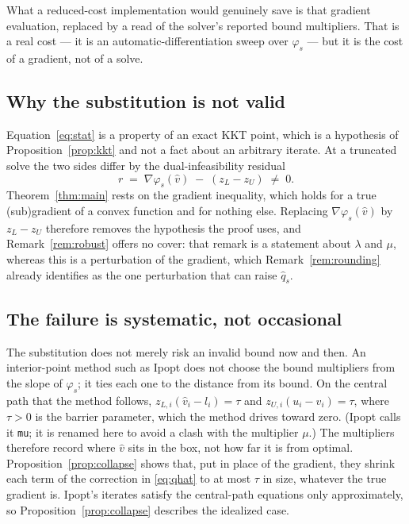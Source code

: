 \documentclass[11pt]{article}
\theoremstyle{plain}
\theoremstyle{remark}
\newcommand{\vhat}{\hat{v}}
\newcommand{\qhat}{\hat{q}}
\begin{document}
What a reduced-cost implementation would genuinely save is that gradient
evaluation, replaced by a read of the solver's reported bound multipliers.  That
is a real cost --- it is an automatic-differentiation sweep over $\varphi_s$ ---
but it is the cost of a gradient, not of a solve.

\subsection{Why the substitution is not valid}

Equation~\eqref{eq:stat} is a property of an exact KKT point, which is a
hypothesis of Proposition~\ref{prop:kkt} and not a fact about an arbitrary
iterate.  At a truncated solve the two sides differ by the dual-infeasibility
residual
\begin{equation}\label{eq:resid}
  r \;=\; \nabla \varphi_s(\vhat) \;-\; (z_L - z_U) \;\ne\; 0 .
\end{equation}
Theorem~\ref{thm:main} rests on the gradient inequality, which holds for a true
(sub)gradient of a convex function and for nothing else.  Replacing
$\nabla \varphi_s(\vhat)$ by $z_L - z_U$ therefore removes the hypothesis the
proof uses, and Remark~\ref{rem:robust} offers no cover: that remark is a
statement about $\lambda$ and $\mu$, whereas this is a perturbation of the
gradient, which Remark~\ref{rem:rounding} already identifies as the one
perturbation that can raise $\qhat_s$.

\subsection{The failure is systematic, not occasional}

The substitution does not merely risk an invalid bound now and then.  An
interior-point method such as Ipopt does not choose the bound multipliers from
the slope of $\varphi_s$; it ties each one to the distance from its bound.  On
the central path that the method follows,
$z_{L,i}(\vhat_i - l_i) = \tau$ and $z_{U,i}(u_i - \vhat_i) = \tau$, where
$\tau > 0$ is the barrier parameter, which the method drives toward zero.
(Ipopt calls it \texttt{mu}; it is renamed here to avoid a clash with the
multiplier $\mu$.)  The multipliers therefore record where $\vhat$ sits in the
box, not how far it is from optimal.  Proposition~\ref{prop:collapse} shows
that, put in place of the gradient, they shrink each term of the correction in
\eqref{eq:qhat} to at most $\tau$ in size, whatever the true gradient is.
Ipopt's iterates satisfy the central-path equations only approximately, so
Proposition~\ref{prop:collapse} describes the idealized case.
\end{document}
